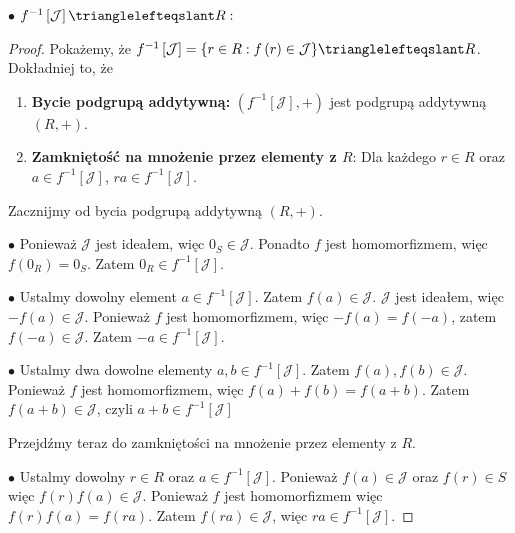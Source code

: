 \begin{solution}
	\noindent $\bullet$ $ f^{-1}\left[ \mathcal{J} \right] \trianglelefteqslant R: $
	\begin{proof}
		Pokażemy, że $f^{-1}\left[ \mathcal{J} \right] = \{r \in R: f\left( r \right) \in \mathcal{J}\} \trianglelefteqslant R$.  
		Dokładniej to, że
		\begin{enumerate}[label=\arabic*.]
			\item \textbf{Bycie podgrupą addytywną:} $\left( f^{-1}\left[ \mathcal{J} \right], +\right)$ jest podgrupą addytywną $\left( R, + \right) $.
			\item \textbf{Zamkniętość na mnożenie przez elementy z $R$}: Dla każdego $r \in R$ oraz $a \in f^{-1}\left[ \mathcal{J} \right] $, $ra \in f^{-1}\left[ \mathcal{J} \right] $. 
		\end{enumerate}
		
		\noindent Zacznijmy od bycia podgrupą addytywną $\left( R, + \right)$. 

		\noindent$\bullet$ Ponieważ $\mathcal{J}$ jest ideałem, więc $0_{\scriptscriptstyle S} \in \mathcal{J}$. Ponadto $f$ jest homomorfizmem, więc $f\left( 0_{\scriptscriptstyle R} \right)  = 0_{\scriptscriptstyle S}$. Zatem $0_{\scriptscriptstyle R} \in f^{-1}\left[ \mathcal{J} \right]$.

		\noindent$\bullet$ Ustalmy dowolny element $a \in f^{-1}\left[ \mathcal{J} \right] $. Zatem $f\left( a \right) \in \mathcal{J}$. $\mathcal{J}$ jest ideałem, więc $-f\left( a \right) \in \mathcal{J}$. Ponieważ $f$ jest homomorfizmem, więc $-f\left( a \right) = f\left( -a \right) $, zatem $f\left( -a \right) \in  \mathcal{J}$. Zatem $-a \in f^{-1}\left[ \mathcal{J} \right]$. 

		\noindent$\bullet$ Ustalmy dwa dowolne elementy $a,b \in f^{-1}\left[ \mathcal{J} \right]$. Zatem $f\left( a \right), f\left( b \right) \in \mathcal{J}$. Ponieważ $f$ jest homomorfizmem, więc $f\left( a \right) + f\left( b \right) = f\left( a + b \right) $. Zatem $f\left( a + b \right) \in \mathcal{J}$, czyli $a+b \in f^{-1}\left[ \mathcal{J} \right] $

		\noindent Przejdźmy teraz do zamkniętości na mnożenie przez elementy z $R$.

		\noindent$\bullet$ Ustalmy dowolny $r \in R$ oraz $a \in f^{-1}\left[ \mathcal{J} \right]$. Ponieważ $f\left( a \right) \in \mathcal{J}$ oraz $f\left( r \right) \in S$ więc $f\left( r \right) f\left( a \right) \in \mathcal{J}$. Ponieważ $f$ jest homomorfizmem więc $f\left( r \right) f\left( a \right) = f\left( ra \right) $. Zatem $f\left( ra \right) \in \mathcal{J}$, więc  $ra \in f^{-1}\left[ \mathcal{J} \right] $.


\end{proof}
\end{solution}
